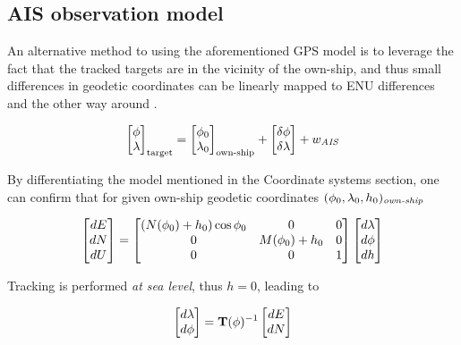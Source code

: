 \subsection{AIS observation model}

An alternative method to using the aforementioned GPS model is to leverage the fact that the tracked targets are in the vicinity of the own-ship, and thus small differences in geodetic coordinates can be linearly mapped to ENU differences and the other way around \cite{Wellenhof1997}.



\begin{equation}
	\begin{bmatrix}
		{\phi}\\ {\lambda}
		\end{bmatrix}_{\text{target}}=
		\begin{bmatrix}
		{\phi}_{0}\\ {\lambda}_{0}
	\end{bmatrix}_{\text{own-ship}} + \begin{bmatrix}
	\delta{\phi} \\ \delta{\lambda}
	\end{bmatrix} + {w}_{\textit{AIS}}
\end{equation}


By differentiating the model mentioned in the Coordinate systems section, one can confirm that for given own-ship geodetic coordinates $({\phi}_0,{\lambda}_0, h_0)_{\textit{own-ship}}$



\begin{equation}
\begin{bmatrix}
dE\\dN\\dU
\end{bmatrix}=
\begin{bmatrix}
(N({\phi}_0)+h_0)\cos{\phi}_0 &0 &0\\
0 &M({\phi}_0) + h_0 &0\\
0 &0 &1
\end{bmatrix}
\begin{bmatrix}
d{\lambda}\\d{\phi}\\dh
\end{bmatrix}
\end{equation}


Tracking is performed \emph{at sea level}, thus $h=0$, leading to


\begin{equation}
\begin{bmatrix}
d{\lambda}\\ d{\phi}
\end{bmatrix}=
\mathbf{T}({\phi})^{-1}
\begin{bmatrix}
dE\\ dN
\end{bmatrix}
\end{equation}



